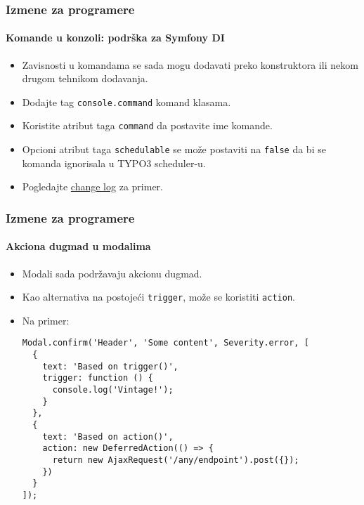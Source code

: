 \begin{frame}[fragile]
	\frametitle{Izmene za programere}
	\framesubtitle{Komande u konzoli: podrška za Symfony DI}

	\begin{itemize}
		\item Zavisnosti u komandama se sada mogu dodavati preko konstruktora ili nekom drugom tehnikom dodavanja.
		\item Dodajte tag \texttt{console.command} komand klasama.
		\item Koristite atribut taga \texttt{command} da postavite ime komande.
		\item Opcioni atribut taga \texttt{schedulable} se može postaviti na \texttt{false}
			da bi se komanda ignorisala u TYPO3 scheduler-u.

		\item Pogledajte
			\href{https://docs.typo3.org/c/typo3/cms-core/master/en-us/Changelog/10.3/Feature-89139-AddDependencyInjectionSupportForConsoleCommands.html}{change log}
			za primer.
	\end{itemize}

\end{frame}


\begin{frame}[fragile]
	\frametitle{Izmene za programere}
	\framesubtitle{Akciona dugmad u modalima}

	\lstset{basicstyle=\tiny\ttfamily}

	\begin{itemize}
		\item Modali sada podržavaju akcionu dugmad.
		\item Kao alternativa na postojeći \texttt{trigger}, može se koristiti \texttt{action}.
		\item Na primer:

\vspace{-0.4cm}
\begin{lstlisting}
Modal.confirm('Header', 'Some content', Severity.error, [
  {
    text: 'Based on trigger()',
    trigger: function () {
      console.log('Vintage!');
    }
  },
  {
    text: 'Based on action()',
    action: new DeferredAction(() => {
      return new AjaxRequest('/any/endpoint').post({});
    })
  }
]);
\end{lstlisting}

	\end{itemize}

\end{frame}

